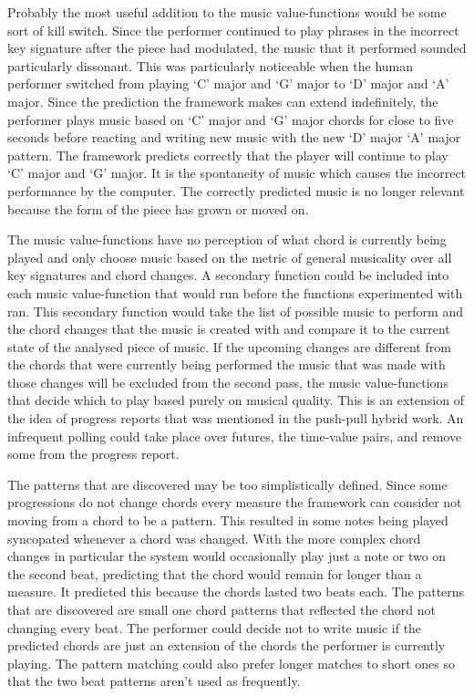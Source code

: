 \documentclass[12pt]{ucthesis}
\begin{document}
Probably the most useful addition to the music value-functions would be some sort of kill switch.  Since the performer continued to play phrases in the incorrect key signature after the piece had modulated, the music that it performed sounded particularly dissonant. This was particularly noticeable when the human performer switched from playing `C' major and `G' major to `D' major and `A' major. Since the prediction the framework makes can extend indefinitely, the performer plays music based on `C' major and `G' major chords for close to five seconds before reacting and writing new music with the new `D' major `A' major pattern. The framework predicts correctly that the player will continue to play `C' major and `G' major. It is the spontaneity of music which causes the incorrect performance by the computer. The correctly predicted music is no longer relevant because the form of the piece has grown or moved on. 

The music value-functions have no perception of what chord is currently being played and only choose music based on the metric of general musicality over all key signatures and chord changes. A secondary function could be included into each music value-function that would run before the functions experimented with ran. This secondary function would take the list of possible music to perform and the chord changes that the music is created with and compare it to the current state of the analysed piece of music. If the upcoming changes are different from the chords that were currently being performed the music that was made with those changes will be excluded from the second pass, the music value-functions that decide which to play based purely on musical quality. This is an extension of the idea of progress reports that was mentioned in the push-pull hybrid work. An infrequent polling could take place over futures, the time-value pairs, and remove some from the progress report. 

The patterns that are discovered may be too simplistically defined. Since some progressions do not change chords every measure the framework can consider not moving from a chord to be a pattern. This resulted in some notes being played syncopated whenever a chord was changed. With the more complex chord changes in particular the system would occasionally play just a note or two on the second beat, predicting that the chord would remain for longer than a measure. It predicted this because the chords lasted two beats each. The patterns that are discovered are small one chord patterns that reflected the chord not changing every beat. The performer could decide not to write music if the predicted chords are just an extension of the chords the performer is currently playing. The pattern matching could also prefer longer matches to short ones so that the two beat patterns aren't used as frequently.
\end{document}
